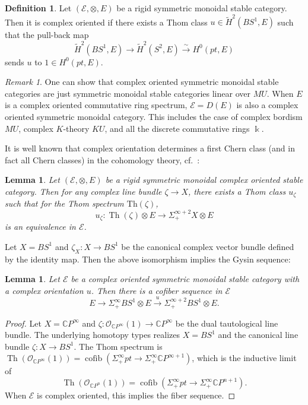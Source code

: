 \documentclass[11pt]{amsart}
\numberwithin{equation}{section}
\theoremstyle{plain}
\newtheorem{Lemma}[lemma]{Lemma}
\theoremstyle{definition}
\newtheorem{Def}[def]{Definition}
\theoremstyle{remark}
\newtheorem{RMK}[rmk]{Remark}
\newcommand{\bC} { {\mathbb{C}}}
\newcommand{\cE} { {\mathcal{E}}}
\newcommand{\cO} { {\mathcal{O}}}
\newcommand{\Thom}{\operatorname{Th}}
\begin{document}
\begin{Def}
Let $(\cE, \otimes, E)$ be a rigid symmetric monoidal stable category. Then it is complex oriented if there exists a Thom class $u \in \widetilde{H}^2(BS^1, E)$ such that the pull-back map
\[\widetilde{H}^2(BS^1, E) \to \widetilde{H}^2(S^2, E) \xrightarrow{\sim} H^0(pt, E)\]
sends $u$ to $1 \in {H}^0(pt, E)$.
\end{Def}
\begin{RMK}
One can show that complex oriented symmetric monoidal stable categories are just symmetric monoidal stable categories linear over $MU$. When $E$ is a complex oriented commutative ring spectrum, $\cE = D(E)$ is also a complex oriented symmetric monoidal category. This includes the case of complex bordism $MU$, complex $K$-theory $KU$, and all the discrete commutative rings $\Bbbk$.
\end{RMK}

It is well known that complex orientation determines a first Chern class (and in fact all Chern classes) in the cohomology theory, cf.~\cite[Proposition 6]{Lurie-chromatic}:

\begin{Lemma}\label{def:complex orientation}
Let $(\cE, \otimes, E)$ be a rigid symmetric monoidal complex oriented stable category. Then for any complex line bundle $\zeta \to X$, there exists a Thom class $u_\zeta$ such that for the Thom spectrum $\mathrm{Th}(\zeta)$,
\[u_\zeta: \Thom(\zeta) \otimes E \to \Sigma^{\infty+2}_+X \otimes E\]
is an equivalence in $\cE$.
\end{Lemma}

Let $X = BS^1$ and $\zeta_X: X \to BS^1$ be the canonical complex vector bundle defined by the identity map. Then the above isomorphism implies the Gysin sequence:

\begin{Lemma}\label{lem:gysin}
Let $\cE$ be a complex oriented symmetric monoidal stable category with a complex orientation $u$. Then there is a cofiber sequence in $\cE$
\begin{equation}\label{eq:gysin-sequence}
E \to \Sigma^\infty_+BS^1 \otimes E \xrightarrow{u} \Sigma^{\infty+2}_+BS^1 \otimes E.
\end{equation}
\end{Lemma}
\begin{proof}
Let $X = \bC P^\infty$ and $\zeta:\cO_{\bC P^\infty}(1)\rightarrow \bC P^\infty$ be the dual tautological line bundle. The underlying homotopy types realizes $X = BS^1$ and the canonical line bundle $\zeta: X \to BS^1$. The Thom spectrum is $\Thom(\cO_{\bC P^\infty}(1))=\operatorname{cofib}(\Sigma^\infty_+{pt} \to \Sigma^\infty_+\bC P^{\infty+1})$, which is the inductive limit of 
\begin{equation}\label{eq:thom}
\Thom(\cO_{\bC P^n}(1))=\operatorname{cofib}(\Sigma^\infty_+{pt} \to \Sigma^\infty_+\bC P^{n+1}).
\end{equation}
When $\cE$ is complex oriented, this implies the fiber sequence.
\end{proof}
\end{document}
